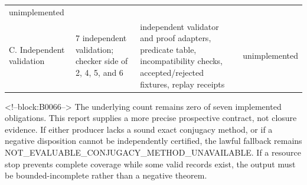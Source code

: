 \documentclass[11pt,a4paper]{article}
\begin{document}
\begin{longtable}[]{@{}llll@{}}
\begin{minipage}[t]{0.22\columnwidth}
unimplemented\strut
\end{minipage}\tabularnewline
\begin{minipage}[t]{0.22\columnwidth}\raggedright
C. Independent validation\strut
\end{minipage} & \begin{minipage}[t]{0.22\columnwidth}\raggedright
7 independent validation; checker side of 2, 4, 5, and 6\strut
\end{minipage} & \begin{minipage}[t]{0.22\columnwidth}\raggedright
independent validator and proof adapters, predicate table, incompatibility checks, accepted/rejected fixtures, replay receipts\strut
\end{minipage} & \begin{minipage}[t]{0.22\columnwidth}\raggedright
unimplemented\strut
\end{minipage}\tabularnewline
\bottomrule
\end{longtable}

<!--block:B0066-->
The underlying count remains zero of seven implemented obligations. This report supplies a more precise prospective contract, not closure evidence. If either producer lacks a sound exact conjugacy method, or if a negative disposition cannot be independently certified, the lawful fallback remains NOT\_EVALUABLE\_CONJUGACY\_METHOD\_UNAVAILABLE. If a resource stop prevents complete coverage while some valid records exist, the output must be bounded-incomplete rather than a negative theorem.
\end{document}
